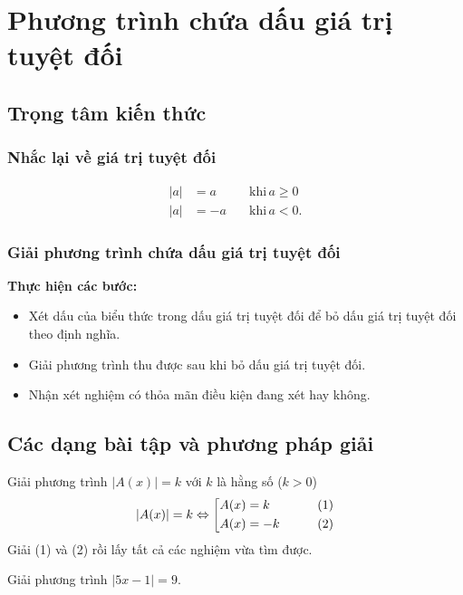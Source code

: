 \section{Phương trình chứa dấu giá trị tuyệt đối}
\subsection{Trọng tâm kiến thức}
\subsubsection{Nhắc lại về giá trị tuyệt đối}

\begin{eqnarray*}
|a|& = a \quad &\text{khi} \, a \ge 0 \\
|a|& =  -a \quad &\text{khi} \, a < 0.
\end{eqnarray*}

\subsubsection{Giải phương trình chứa dấu giá trị tuyệt đối}
\textbf{Thực hiện các bước:}
\begin{itemize}
	\item Xét dấu của biểu thức trong dấu giá trị tuyệt đối để bỏ dấu giá trị tuyệt đối theo định nghĩa.
	\item Giải phương trình thu được sau khi bỏ dấu giá trị tuyệt đối.
	\item Nhận xét nghiệm có thỏa mãn điều kiện đang xét hay không.
\end{itemize}

\subsection{Các dạng bài tập và phương pháp giải}

\begin{dang}{Giải phương trình $|A(x)|=k$ với $k$ là hằng số ($k>0$)}
\[|A(x)| = k \Leftrightarrow \left[\begin{aligned}& A(x) = k & \qquad (1) \\ & A(x) = -k & \qquad(2)\end{aligned}\right.\]
Giải (1) và (2) rồi lấy tất cả các nghiệm vừa tìm được.
\end{dang}

\begin{vd}%
Giải phương trình $|5x-1|=9$.
\end{vd}

